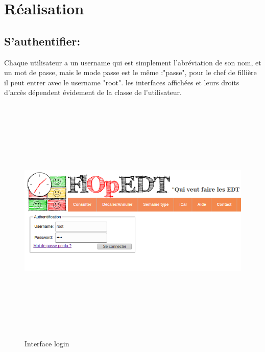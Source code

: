 \newpage
\section{Réalisation}
\subsection*{S'authentifier:}
Chaque utilisateur a un username qui est simplement l'abréviation de son nom, et un mot de passe, mais le mode passe est le même :"passe", pour le chef de fillière il peut entrer avec le username "root". les interfaces affichées et leurs  droits d'accès dépendent évidement de la classe de l'utilisateur. 
\begin{figure}[H]
      \centering
        \includegraphics[width=14cm,height=12cm]{img/1.png}
        \caption{Interface login}
\end{figure}
\newpage
